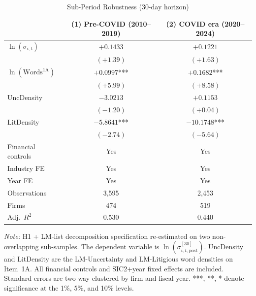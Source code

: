 \begin{table}[htbp]
\centering
\caption{Sub-Period Robustness (30-day horizon)}
\label{tab:subperiod}
\begin{tabular}{lcc}
\toprule
 & (1) Pre-COVID (2010--2019) & (2) COVID era (2020--2024) \\
\midrule
$\ln(\sigma_{i,t})$ & $+0.1433$ & $+0.1221$ \\
 & $(+1.39)$ & $(+1.63)$ \\[4pt]
$\ln(\text{Words}^{\text{1A}})$ & $+0.0997$*** & $+0.1682$*** \\
 & $(+5.99)$ & $(+8.58)$ \\[4pt]
UncDensity & $-3.0213$ & $+0.1153$ \\
 & $(-1.20)$ & $(+0.04)$ \\[4pt]
LitDensity & $-5.8641$*** & $-10.1748$*** \\
 & $(-2.74)$ & $(-5.64)$ \\[4pt]
\midrule
Financial controls & Yes & Yes \\
Industry FE & Yes & Yes \\
Year FE & Yes & Yes \\
Observations & 3,595 & 2,453 \\
Firms & 474 & 519 \\
Adj.\ $R^2$ & 0.530 & 0.440 \\
\bottomrule
\end{tabular}
\par\smallskip
\noindent\footnotesize 
\textit{Note:} H1 + LM-list decomposition specification re-estimated on two non-overlapping sub-samples. The dependent variable is $\ln(\sigma_{i,t,\mathrm{post}}^{[30]})$. UncDensity and LitDensity are the LM-Uncertainty and LM-Litigious word densities on Item~1A. All financial controls and SIC2$+$year fixed effects are included. Standard errors are two-way clustered by firm and fiscal year. ***, **, * denote significance at the 1\%, 5\%, and 10\% levels.
\end{table}